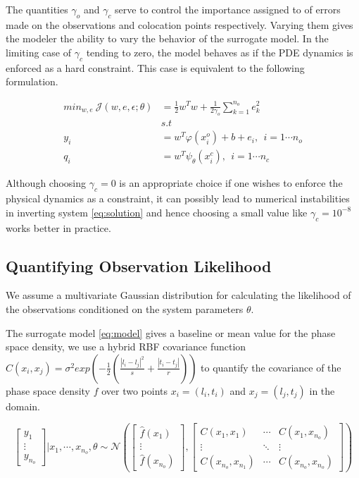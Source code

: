 \documentclass{article}
\begin{document}
The quantities $\gamma_o$ and $\gamma_c$ serve to control the importance assigned to
of errors made on the observations and colocation points respectively. Varying them 
gives the modeler the ability to vary the behavior of the surrogate model. In the 
limiting case of $\gamma_c$ tending to zero, the model behaves as if the PDE dynamics
is enforced as a hard constraint. This case is equivalent to the following formulation.

\begin{align}\label{eq:surrogate2}
   min_{w,e} \ \mathcal{J}(w,e,\epsilon;\theta) &= 
   \frac{1}{2} w^{T}w + \frac{1}{2\gamma_{o}} \sum_{k = 1}^{n_{o}}{e^{2}_{k}} \\
  & s.t \nonumber \\
  y_{i} & = w^{T}\varphi(x^{o}_{i}) + b + e_{i}, \ \ i = 1 \cdots n_{o} \\
  q_{i} & = w^{T}\psi_{\theta}(x^{c}_{i}), \ \ i = 1 \cdots n_{c}
\end{align}

Although choosing $\gamma_c = 0$ is an appropriate choice if one wishes
to enforce the physical dynamics as a constraint, it can possibly lead to numerical
instabilities in inverting system \ref{eq:solution} and hence choosing a small
value like $\gamma_c = 10^{-8}$ works better in practice.


\subsection{Quantifying Observation Likelihood}

We assume a multivariate Gaussian distribution for calculating the likelihood of 
the observations conditioned on the system parameters $\theta$. 

The surrogate model \ref{eq:model} gives a baseline or mean value for the phase space density, we use a
hybrid RBF covariance function $C(x_{i}, x_{j}) = \sigma^2 exp(-\frac{1}{2} (\frac{|l_i - l_j|^2}{s} + \frac{|t_i - t_j|}{r}))$
to quantify the covariance of the phase space density $f$ over two points 
$x_i = (l_i, t_i)$ and $x_j = (l_j, t_j)$ in the domain. 

\begin{equation}
\begin{bmatrix}
y_1\\ 
\vdots\\ 
y_{n_o}
\end{bmatrix} | x_1, \cdots, x_{n_o}, \theta \sim \mathcal{N} \left(\begin{bmatrix}
\hat{f}(x_1)\\ 
\vdots\\ 
\hat{f}(x_{n_o})
\end{bmatrix}, \begin{bmatrix}
C(x_1, x_1) & \cdots  & C(x_1, x_{n_o})\\ 
\vdots & \ddots & \vdots\\ 
C(x_{n_o}, x_{n_{1}}) & \cdots  & C(x_{n_o}, x_{n_{o}})
\end{bmatrix} \right )
\end{equation}
\end{document}
